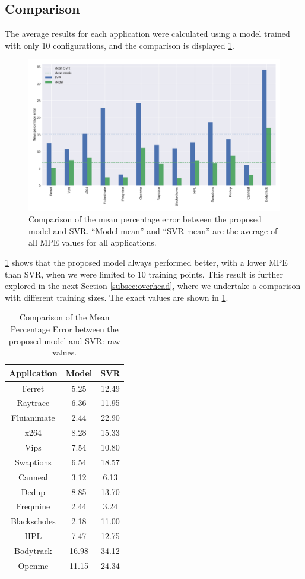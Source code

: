 \subsection{Comparison}
The average results for each application were calculated using a model trained with only 10 configurations, and the comparison is displayed \cref{fig:mpe_svr_eq}. %
\begin{figure}[H]
	\centering
	\includegraphics[width=.8\columnwidth]{models/figures/mpe_svr_eq.pdf}
	\caption{Comparison of the mean percentage error between the proposed model and SVR. ``Model mean'' and ``SVR mean'' are the average of all MPE values for all applications.
	}
	\label{fig:mpe_svr_eq}
\end{figure}

\cref{fig:mpe_svr_eq} shows that the proposed model always performed better, with a lower MPE than SVR, when we were limited to 10 training points. This result is further explored in the next Section \ref{subsec:overhead}, where we undertake a comparison with different training sizes. The exact values are shown in \cref{tab:mpe_svr_eq}.

\begin{table}[H]
\centering
\begin{tabular}{c|c|c}
\hline
Application  & Model & SVR   \\ \hline
Ferret       & 5.25     & 12.49  \\ 
Raytrace     & 6.36     & 11.95  \\
Fluianimate  & 2.44     & 22.90  \\
x264         & 8.28     & 15.33  \\
Vips         & 7.54     & 10.80  \\
Swaptions    & 6.54     & 18.57  \\
Canneal      & 3.12     & 6.13   \\
Dedup        & 8.85     & 13.70  \\
Freqmine     & 2.44     & 3.24   \\
Blackscholes & 2.18     & 11.00  \\
HPL          & 7.47     & 12.75  \\
Bodytrack    & 16.98    & 34.12  \\
Openmc       & 11.15    & 24.34  \\
\end{tabular}
\caption{Comparison of the Mean Percentage Error between the proposed model and SVR: raw values.}
\label{tab:mpe_svr_eq}
\end{table}

